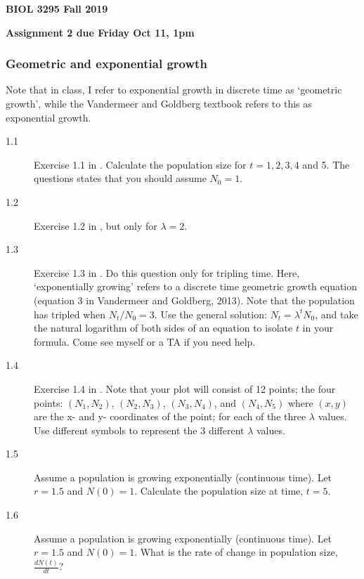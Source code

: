 \documentclass[10pt, oneside]{article}   	%
\begin{document}
\textbf{BIOL 3295 Fall 2019}

\textbf{Assignment 2 due Friday Oct 11, 1pm}

\subsubsection*{Geometric and exponential growth}
Note that in class, I refer to exponential growth in discrete time as `geometric growth', while the Vandermeer and Goldberg textbook refers to this as exponential growth.

\begin{description}
\item[1.1] Exercise 1.1 in \cite{vandermeer}. Calculate the population size for $t = 1, 2, 3, 4$ and 5. The questions states that you should assume $N_0=1$.
\item[1.2] Exercise 1.2 in \cite{vandermeer}, but only for $\lambda = 2$.
\item[1.3] Exercise 1.3 in \cite{vandermeer}. Do this question only for tripling time. Here, `exponentially growing' refers to a discrete time geometric growth equation (equation 3 in Vandermeer and Goldberg, 2013). Note that the population has tripled when $N_{t}/N_0 = 3$. Use the general solution: $N_t = \lambda^t N_0$, and take the natural logarithm of both sides of an equation to isolate $t$ in your formula. Come see myself or a TA if you need help. 
\item[1.4] Exercise 1.4 in \cite{vandermeer}. Note that your plot will consist of 12 points; the four points: $(N_1, N_2)$, $(N_2, N_3)$, $(N_3, N_4)$, and $(N_4, N_5)$ where $(x,y)$ are the x- and y- coordinates of the point; for each of the three $\lambda$ values. Use different symbols to represent the 3 different $\lambda$ values.
\item[1.5] Assume a population is growing exponentially (continuous time). Let $r=1.5$ and $N(0)=1$. Calculate the population size at time, $t=5$. 
\item[1.6] Assume a population is growing exponentially (continuous time). Let $r=1.5$ and $N(0)=1$. What is the rate of change in population size, $\frac{dN(t)}{dt}$?
\end{description}
\end{document}
